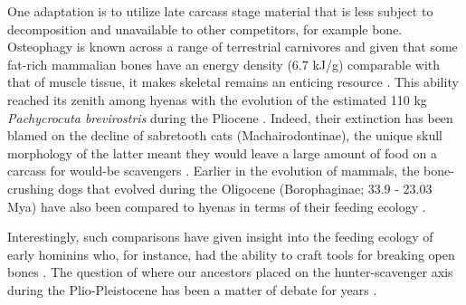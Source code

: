\documentclass[a4paper,12pt]{article}
\begin{document}

One adaptation is to utilize late carcass stage material that is less subject to decomposition and unavailable to other competitors, for example bone.
Osteophagy is known across a range of terrestrial carnivores and given that some fat-rich mammalian bones have an energy density (6.7 kJ/g) comparable with that of muscle tissue, it makes skeletal remains an enticing resource \citep{brown1989study}.
This ability reached its zenith among hyenas with the evolution of the estimated 110 kg \textit{Pachycrocuta brevirostris} during the Pliocene \citep[3.6 - 2.58 Mya; ][]{palmqvist2011giant}.
Indeed, their extinction has been blamed on the decline of sabretooth cats (Machairodontinae), the unique skull morphology of the latter meant they would leave a large amount of food on a carcass for would-be scavengers \citep{palmqvist2011giant}. 
Earlier in the evolution of mammals, the bone-crushing dogs that evolved during the Oligocene (Borophaginae; 33.9 - 23.03 Mya) have also been compared to hyenas in terms of their feeding ecology \citep{van2003chapter,martin2016pursuit}.




Interestingly, such comparisons have given insight into the feeding ecology of early hominins who, for instance, had the ability to craft tools for breaking open bones \citep{ARCM:ARCM12084}.
The question of where our ancestors placed on the hunter-scavenger axis during the Plio-Pleistocene has been a matter of debate for years \citep{dominguez2002hunting}.
\end{document}
